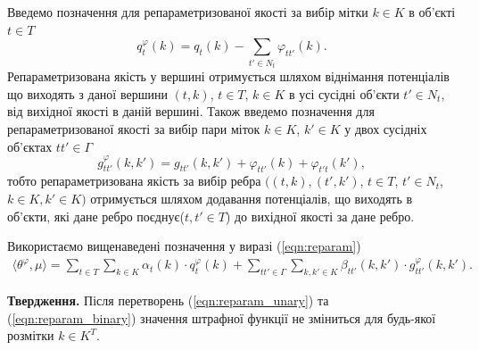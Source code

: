 Введемо позначення для репараметризованої якості за вибір мітки $k\in K$ в 
об'єкті $t\in T$
\begin{equation}
  \label{eqn:reparam_unary}
  q^{\varphi}_t(k) = q_t(k) - \sum\limits_{t'\in N_t} \varphi_{tt'}(k).
\end{equation}
Репараметризована якість у вершині отримується шляхом віднімання потенціалів
що виходять з даної вершини $(t,k)$, $t\in T$, $k\in K$ в усі сусідні об'єкти
$t'\in N_t$, від вихідної якості в даній вершині. Також введемо позначення для 
репараметризованої якості за вибір пари міток $k\in K$, $k'\in K$ у двох сусідніх
об'єктах $tt'\in\Gamma$
\begin{equation}
  \label{eqn:reparam_binary}
  g^{\varphi}_{tt'}(k,k') = g_{tt'}(k,k') + \varphi_{tt'}(k) + \varphi_{t't}(k'),
\end{equation}
тобто репараметризована якість за вибір ребра $((t,k),(t',k')$, $t\in T$, $t'\in N_t$, $k\in K, k'\in K)$
отримується шляхом додавання потенціалів, що виходять в об'єкти, які дане ребро поєднує($t,t'\in T$)
до вихідної якості за дане ребро.

Використаємо вищенаведені позначення у виразі (\ref{eqn:reparam})
\begin{equation}
  \begin{aligned}
  \langle\theta^{\varphi},\mu\rangle =  \sum\limits_{t\in T}\sum\limits_{k\in K} \alpha_t(k)\cdot q^{\varphi}_t(k)+
  \sum\limits_{tt'\in \Gamma}\sum\limits_{k,k'\in K} \beta_{tt'}(k,k')\cdot g^{\varphi}_{tt'}(k,k').
  \end{aligned}
\end{equation}

\textbf{Твердження.}
Після перетворень (\ref{eqn:reparam_unary}) та (\ref{eqn:reparam_binary}) значення
штрафної функції не зміниться для будь-якої розмітки $k\in K^T$.

